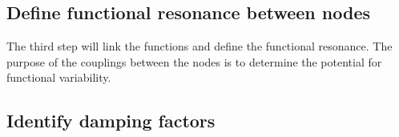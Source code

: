 \subsection{Define functional resonance between nodes}
The third step will link the functions and define the functional resonance. The purpose of the couplings between the nodes is to determine the potential for functional variability.
\subsection{Identify damping factors}

